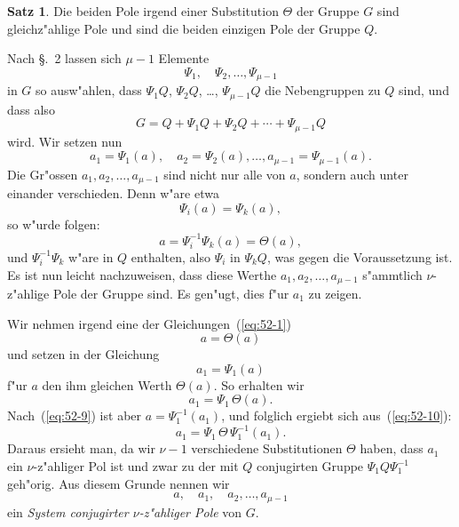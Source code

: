 \documentclass[12pt,a4paper]{article}
\theoremstyle{definition}
\newtheorem*{satz}{Satz}
\begin{document}
\begin{satz}
Die beiden Pole irgend einer Substitution $\Theta$ der Gruppe $G$ sind gleichz"ahlige Pole und sind die beiden einzigen Pole der Gruppe $Q$.
\end{satz}

Nach \S.~2 lassen sich $\mu - 1$ Elemente
\begin{equation}\label{eq:52-5}
\Psi_1, \quad \Psi_2, \ldots, \Psi_{\mu-1}
\end{equation}
in $G$ so ausw"ahlen, dass $\Psi_1 Q$, $\Psi_2 Q$, \ldots, $\Psi_{\mu-1} Q$ die Nebengruppen zu $Q$ sind, und dass also
\begin{equation}\label{eq:52-6}
G = Q + \Psi_1 Q + \Psi_2 Q + \cdots + \Psi_{\mu-1} Q
\end{equation}
wird. Wir setzen nun
\begin{equation}\label{eq:52-7}
a_1 = \Psi_1(a), \quad a_2 = \Psi_2(a), \ldots, a_{\mu-1} = \Psi_{\mu-1}(a).
\end{equation}
Die Gr"ossen $a_1, a_2, \ldots, a_{\mu-1}$ sind nicht nur alle von $a$, sondern auch unter einander verschieden. Denn w"are etwa
\[
\Psi_i(a) = \Psi_k(a),
\]
so w"urde folgen:
\[
a = \Psi_i^{-1}\Psi_k(a) = \Theta(a),
\]
und $\Psi_i^{-1}\Psi_k$ w"are in $Q$ enthalten, also $\Psi_i$ in $\Psi_k Q$, was gegen die Voraussetzung ist. Es ist nun leicht nachzuweisen, dass diese Werthe $a_1, a_2, \ldots, a_{\mu-1}$ s"ammtlich $\nu$-z"ahlige Pole der Gruppe sind. Es gen"ugt, dies f"ur $a_1$ zu zeigen.

Wir nehmen irgend eine der Gleichungen~(\ref{eq:52-1})
\begin{equation}\label{eq:52-8}
a = \Theta(a)
\end{equation}
und setzen in der Gleichung
\begin{equation}\label{eq:52-9}
a_1 = \Psi_1(a)
\end{equation}
f"ur $a$ den ihm gleichen Werth $\Theta(a)$. So erhalten wir
\begin{equation}\label{eq:52-10}
a_1 = \Psi_1\,\Theta(a).
\end{equation}
Nach~(\ref{eq:52-9}) ist aber $a = \Psi_1^{-1}(a_1)$, und folglich ergiebt sich aus~(\ref{eq:52-10}):
\begin{equation}\label{eq:52-11}
a_1 = \Psi_1\,\Theta\,\Psi_1^{-1}(a_1).
\end{equation}
Daraus ersieht man, da wir $\nu - 1$ verschiedene Substitutionen $\Theta$ haben, dass $a_1$ ein $\nu$-z"ahliger Pol ist und zwar zu der mit $Q$ conjugirten Gruppe $\Psi_1 Q\Psi_1^{-1}$ geh"orig. Aus diesem Grunde nennen wir
\begin{equation}\label{eq:52-12}
a, \quad a_1, \quad a_2, \ldots, a_{\mu-1}
\end{equation}
ein \emph{System conjugirter $\nu$-z"ahliger Pole} von $G$.
\end{document}
